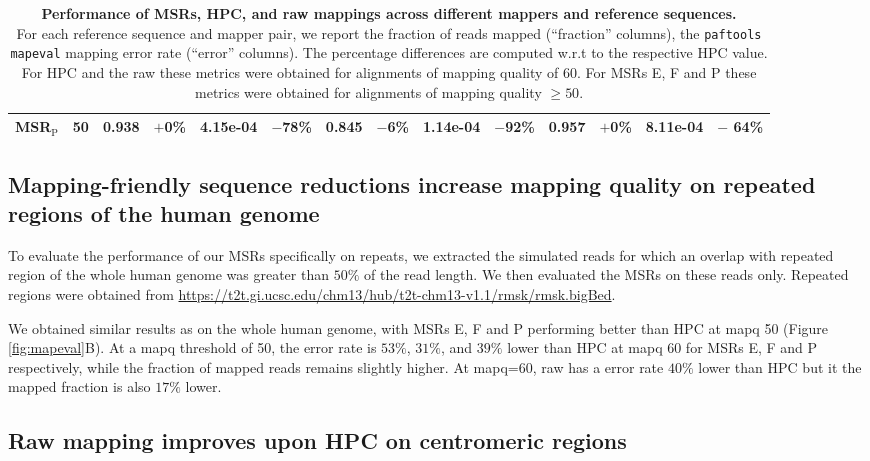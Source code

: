 \documentclass[
  11,
]{scrbook}
\begin{document}
\begin{table}[h!]
{\begin{tabular}{@{}rlr@{}lr@{}lr@{}lr@{}lr@{}lr@{}l@{}}
MSR$_{\text{P}}$     & 50         & \textbf{0.938} & \textbf{\:\small$+$0\%} & 4.15e-04          & {\:\footnotesize$-$78\%} & 0.845          & {\:\footnotesize$-$6\%} & 1.14e-04          & {\:\footnotesize$-$92\%} & 0.957          & {\:\footnotesize$+$0\%} & 8.11e-04      & {\:\footnotesize$-$ 64\%} \\ \bottomrule
\end{tabular}%
}
\caption{\label{tab:table-subset}
\textbf{Performance of MSRs, HPC, and raw mappings across different mappers and reference sequences.} \\
For each reference sequence and mapper pair, we report the fraction of reads mapped (``fraction'' columns), the \texttt{paftools mapeval} mapping error rate (``error'' columns). The percentage differences are computed w.r.t to the respective HPC value. For HPC and the raw these metrics were obtained for alignments of mapping quality of 60. For MSRs E, F and P these metrics were obtained for alignments of mapping quality $\geq 50$. 
}
\end{table}

\hypertarget{mapping-friendly-sequence-reductions-increase-mapping-quality-on-repeated-regions-of-the-human-genome}{%
\subsection{Mapping-friendly sequence reductions increase mapping quality on repeated regions of the human genome}\label{mapping-friendly-sequence-reductions-increase-mapping-quality-on-repeated-regions-of-the-human-genome}}

To evaluate the performance of our MSRs specifically on repeats, we
extracted the simulated reads for which an overlap with repeated region
of the whole human genome was greater than \(50\%\) of the read length. We
then evaluated the MSRs on these reads only. Repeated regions were
obtained from
\url{https://t2t.gi.ucsc.edu/chm13/hub/t2t-chm13-v1.1/rmsk/rmsk.bigBed}.

We obtained similar results as on the whole human genome, with MSRs E, F
and P performing better than HPC at mapq 50
(Figure \ref{fig:mapeval}B). At a mapq threshold of 50, the error rate is
\(53\%\), \(31\%\), and \(39\%\) lower than HPC at mapq 60 for MSRs E, F and P
respectively, while the fraction of mapped reads remains slightly
higher. At mapq=60, raw has a error rate \(40\%\) lower than HPC but it
the mapped fraction is also \(17\%\) lower.

\hypertarget{raw-mapping-improves-upon-hpc-on-centromeric-regions}{%
\subsection{Raw mapping improves upon HPC on centromeric regions}\label{raw-mapping-improves-upon-hpc-on-centromeric-regions}}
\end{document}
